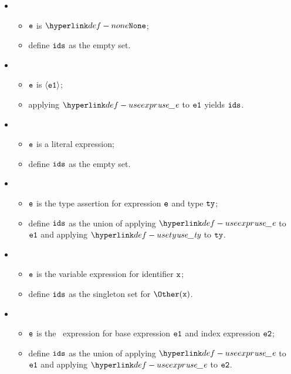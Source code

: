 \ProseParagraph
\OneApplies
\begin{itemize}
  \item {}
  \begin{itemize}
    \item $\texttt{e}$ is $\None$;
    \item define $\texttt{ids}$ as the empty set.
  \end{itemize}

  \item {}
  \begin{itemize}
    \item $\texttt{e}$ is $\langle\texttt{e1}\rangle$;
    \item applying $\useexpr$ to $\texttt{e1}$ yields $\texttt{ids}$.
  \end{itemize}

  \item {}
  \begin{itemize}
    \item $\texttt{e}$ is a literal expression;
    \item define $\texttt{ids}$ as the empty set.
  \end{itemize}

  \item {}
  \begin{itemize}
    \item $\texttt{e}$ is the type assertion for expression $\texttt{e}$ and type $\texttt{ty}$;
    \item define $\texttt{ids}$ as the union of applying $\useexpr$ to $\texttt{e1}$ and applying $\usety$ to $\texttt{ty}$.
  \end{itemize}

  \item {}
  \begin{itemize}
    \item $\texttt{e}$ is the variable expression for identifier $\texttt{x}$;
    \item define $\texttt{ids}$ as the singleton set for $\Other(\vx)$.
  \end{itemize}

  \item {}
  \begin{itemize}
    \item $\texttt{e}$ is the \arrayaccessterm\ expression for base expression $\texttt{e1}$ and index expression $\texttt{e2}$;
    \item define $\texttt{ids}$ as the union of applying $\useexpr$ to $\texttt{e1}$ and applying $\useexpr$ to $\texttt{e2}$.
  \end{itemize}


\end{itemize}
